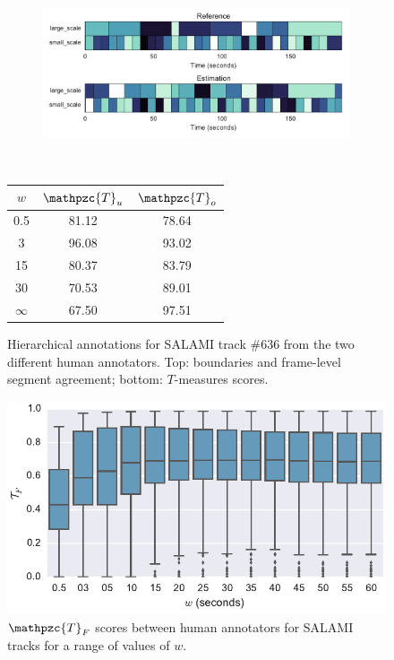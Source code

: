 \documentclass{article}
\def\shag{\ensuremath{\mathpzc{T}}}
\begin{document}
\begin{figure}[t]
  \centering
  \begin{subfigure}{0.5\textwidth}
    \centering
    \includegraphics[width=0.99\textwidth]{figs/SALAMI-SALAMI.pdf}
  \end{subfigure}%
  \\
  \begin{minipage}{0.5\textwidth}
    \centering
    \vspace{10pt}
    \begin{tabular}{|c|c|c|}
      \hline
      $w$       & $\shag_u$       & $\shag_o$      \\
      \hline
      0.5       & 81.12       & 78.64      \\     
      3         & 96.08       & 93.02      \\
      15        & 80.37       & 83.79    \\
      30        & 70.53       & 89.01    \\
      $\infty$  & 67.50       & 97.51    \\
      \hline
    \end{tabular}
  \end{minipage}
  \caption{Hierarchical annotations for SALAMI track \#636 from the two different human annotators. Top: boundaries and frame-level segment agreement; bottom: $T$-measures scores.}
  \label{fig:SALAMI-SALAMI}
\end{figure}

\begin{figure}
    \centering
    \includegraphics[width=\columnwidth]{figs/tfw}
    \caption{$\shag_F$ scores between human annotators for SALAMI tracks for a range of values of $w$.\label{fig:salami-agree}}
\end{figure}
\end{document}
